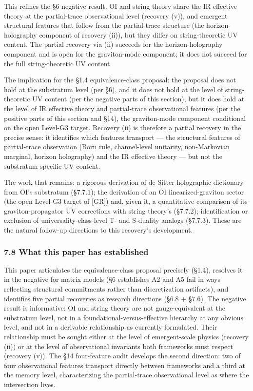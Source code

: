 \documentclass[
]{article}
\begin{document}
This refines the §6 negative result. OI and string theory share the IR
effective theory at the partial-trace observational level (recovery
(v)), and emergent structural features that follow from the
partial-trace structure (the horizon-holography component of recovery
(ii)), but they differ on string-theoretic UV content. The partial
recovery via (ii) succeeds for the horizon-holography component and is
open for the graviton-mode component; it does not succeed for the full
string-theoretic UV content.

The implication for the §1.4 equivalence-class proposal: the proposal
does not hold at the substratum level (per §6), and it does not hold at
the level of string-theoretic UV content (per the negative parts of this
section), but it does hold at the level of IR effective theory and
partial-trace observational features (per the positive parts of this
section and §14), the graviton-mode component conditional on the open
Level-G3 target. Recovery (ii) is therefore a partial recovery in the
precise sense: it identifies which features transport --- the structural
features of partial-trace observation (Born rule, channel-level
unitarity, non-Markovian marginal, horizon holography) and the IR
effective theory --- but not the substratum-specific UV content.

The work that remains: a rigorous derivation of de Sitter holographic
dictionary from OI's substratum (§7.7.1); the derivation of an OI
linearized-graviton sector (the open Level-G3 target of {[}GR{]}) and,
given it, a quantitative comparison of its graviton-propagator UV
corrections with string theory's (§7.7.2); identification or exclusion
of universality-class-level T- and S-duality analogs (§7.7.3). These are
the natural follow-up directions to this recovery's development.

\hypertarget{what-this-paper-has-established}{%
\subsubsection{7.8 What this paper has
established}\label{what-this-paper-has-established}}

This paper articulates the equivalence-class proposal precisely (§1.4),
resolves it in the negative for matrix models (§6 establishes A2 and A5
fail in ways reflecting structural commitments rather than
discretization artifacts), and identifies five partial recoveries as
research directions (§6.8 + §7.6). The negative result is informative:
OI and string theory are not gauge-equivalent at the substratum level,
not in a foundational-versus-effective hierarchy at any obvious level,
and not in a derivable relationship as currently formulated. Their
relationship must be sought either at the level of emergent-scale
physics (recovery (ii)) or at the level of observational invariants both
frameworks must respect (recovery (v)). The §14 four-feature audit
develops the second direction: two of four observational features
transport directly between frameworks and a third at the memory level,
characterizing the partial-trace observational level as where the
intersection lives.
\end{document}
